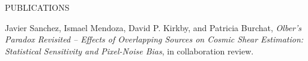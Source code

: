 \documentclass{resume} %
\begin{document}
\begin{rSection}{PUBLICATIONS}
%
\vspace*{-1em}
\item Javier Sanchez, Ismael Mendoza, David P. Kirkby, and Patricia Burchat, \textit{Olber’s Paradox Revisited – Effects of Overlapping Sources on Cosmic Shear Estimation:  Statistical Sensitivity and Pixel-Noise Bias}, in collaboration review.
%
\end{rSection}


\end{document}
